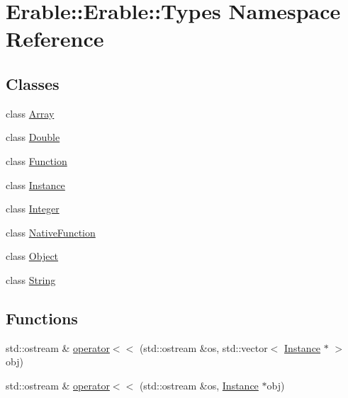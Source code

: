 \hypertarget{namespace_erable_1_1_erable_1_1_types}{}\section{Erable\+::Erable\+::Types Namespace Reference}
\label{namespace_erable_1_1_erable_1_1_types}
\subsection*{Classes}
\begin{DoxyCompactItemize}
\item 
class \mbox{\hyperlink{class_erable_1_1_erable_1_1_types_1_1_array}{Array}}
\item 
class \mbox{\hyperlink{class_erable_1_1_erable_1_1_types_1_1_double}{Double}}
\item 
class \mbox{\hyperlink{class_erable_1_1_erable_1_1_types_1_1_function}{Function}}
\item 
class \mbox{\hyperlink{class_erable_1_1_erable_1_1_types_1_1_instance}{Instance}}
\item 
class \mbox{\hyperlink{class_erable_1_1_erable_1_1_types_1_1_integer}{Integer}}
\item 
class \mbox{\hyperlink{class_erable_1_1_erable_1_1_types_1_1_native_function}{Native\+Function}}
\item 
class \mbox{\hyperlink{class_erable_1_1_erable_1_1_types_1_1_object}{Object}}
\item 
class \mbox{\hyperlink{class_erable_1_1_erable_1_1_types_1_1_string}{String}}
\end{DoxyCompactItemize}
\subsection*{Functions}
\begin{DoxyCompactItemize}
\item 
std\+::ostream \& \mbox{\hyperlink{namespace_erable_1_1_erable_1_1_types_a79c4205df15e52d78f26cc623c1170db}{operator$<$$<$}} (std\+::ostream \&os, std\+::vector$<$ \mbox{\hyperlink{class_erable_1_1_erable_1_1_types_1_1_instance}{Instance}} $\ast$ $>$ obj)
\item 
std\+::ostream \& \mbox{\hyperlink{namespace_erable_1_1_erable_1_1_types_a416026fb846690591620fe9ef9393567}{operator$<$$<$}} (std\+::ostream \&os, \mbox{\hyperlink{class_erable_1_1_erable_1_1_types_1_1_instance}{Instance}} $\ast$obj)
\end{DoxyCompactItemize}


